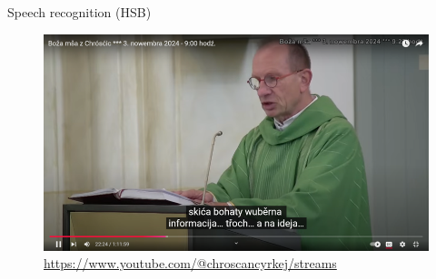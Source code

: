   \begin{block}{Speech recognition (HSB)}
    


    \begin{figure}
        \centering
        \includegraphics[width=0.7\colwidth]{01_z_01_citanje.png}
        \caption{\url{https://www.youtube.com/@chroscancyrkej/streams}}
        \label{fig:webcaptioner}
    \end{figure}

    
  \end{block}
